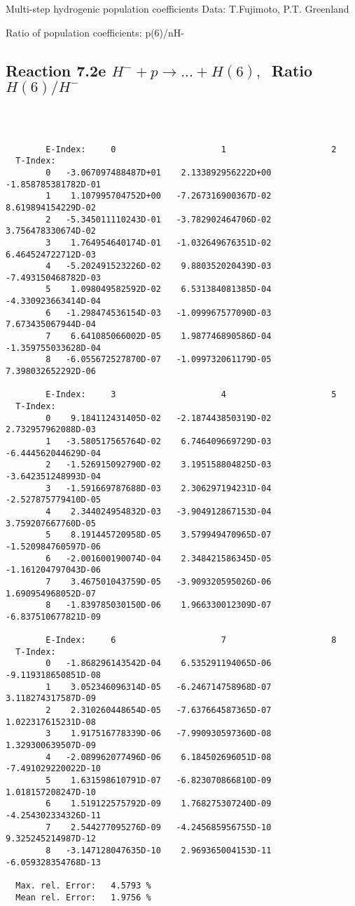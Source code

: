 \documentclass[12pt]{article}
\begin{document}
 Multi-step hydrogenic population coefficients
 Data: T.Fujimoto, P.T. Greenland

 Ratio of population coefficients: p(6)/nH-

\subsection{
Reaction 7.2e $ H^- + p \rightarrow ...+ H(6) , \  $
Ratio $H(6)/H^- $
}

\begin{small}\begin{verbatim}



        E-Index:     0                     1                     2
  T-Index:
        0   -3.067097488487D+01    2.133892956222D+00   -1.858785381782D-01
        1    1.107995704752D+00   -7.267316900367D-02    8.619894154229D-02
        2   -5.345011110243D-01   -3.782902464706D-02    3.756478330674D-02
        3    1.764954640174D-01   -1.032649676351D-02    6.464524722712D-03
        4   -5.202491523226D-02    9.880352020439D-03   -7.493150468782D-03
        5    1.098049582592D-02    6.531384081385D-04   -4.330923663414D-04
        6   -1.298474536154D-03   -1.099967577090D-03    7.673435067944D-04
        7    6.641085066002D-05    1.987746890586D-04   -1.359755033628D-04
        8   -6.055672527870D-07   -1.099732061179D-05    7.398032652292D-06

        E-Index:     3                     4                     5
  T-Index:
        0    9.184112431405D-02   -2.187443850319D-02    2.732957962088D-03
        1   -3.580517565764D-02    6.746409669729D-03   -6.444562044629D-04
        2   -1.526915092790D-02    3.195158804825D-03   -3.642351248993D-04
        3   -1.591669787688D-03    2.306297194231D-04   -2.527875779410D-05
        4    2.344024954832D-03   -3.904912867153D-04    3.759207667760D-05
        5    8.191445720958D-05    3.579949470965D-07   -1.520984760597D-06
        6   -2.001600190074D-04    2.348421586345D-05   -1.161204797043D-06
        7    3.467501043759D-05   -3.909320595026D-06    1.690954968052D-07
        8   -1.839785030150D-06    1.966330012309D-07   -6.837510677821D-09

        E-Index:     6                     7                     8
  T-Index:
        0   -1.868296143542D-04    6.535291194065D-06   -9.119318650851D-08
        1    3.052346096314D-05   -6.246714758968D-07    3.118274317587D-09
        2    2.310260448654D-05   -7.637664587365D-07    1.022317615231D-08
        3    1.917516778339D-06   -7.990930597360D-08    1.329300639507D-09
        4   -2.089962077496D-06    6.184502696051D-08   -7.491029220022D-10
        5    1.631598610791D-07   -6.823070866810D-09    1.018157208247D-10
        6    1.519122575792D-09    1.768275307240D-09   -4.254302334326D-11
        7    2.544277095276D-09   -4.245685956755D-10    9.325245214987D-12
        8   -3.147128047635D-10    2.969365004153D-11   -6.059328354768D-13

  Max. rel. Error:   4.5793 %
  Mean rel. Error:   1.9756 %

\end{verbatim}\end{small}
\end{document}
